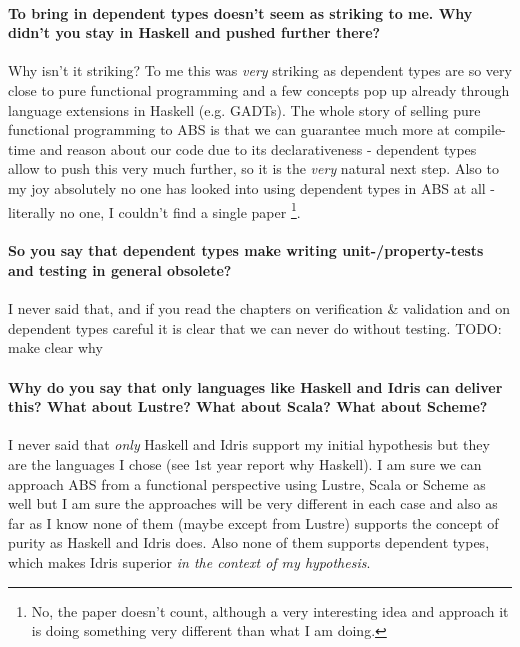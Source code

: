 \paragraph{To bring in dependent types doesn't seem as striking to me. Why didn't you stay in Haskell and pushed further there?}
Why isn't it striking? To me this was \textit{very} striking as dependent types are so very close to pure functional programming and a few concepts pop up already through language extensions in Haskell (e.g. GADTs). The whole story of selling pure functional programming to ABS is that we can guarantee much more at compile-time and reason about our code due to its declarativeness - dependent types allow to push this very much further, so it is the \textit{very} natural next step. Also to my joy absolutely no one has looked into using dependent types in ABS at all - literally no one, I couldn't find a single paper \footnote{No, the paper \cite{botta_functional_2011} doesn't count, although a very interesting idea and approach it is doing something very different than what I am doing.}.

\paragraph{So you say that dependent types make writing unit-/property-tests and testing in general obsolete?}
I never said that, and if you read the chapters on verification \& validation and on dependent types careful it is clear that we can never do without testing. TODO: make clear why

\paragraph{Why do you say that only languages like Haskell and Idris can deliver this? What about Lustre? What about Scala? What about Scheme?}
I never said that \textit{only} Haskell and Idris support my initial hypothesis but they are the languages I chose (see 1st year report why Haskell). I am sure we can approach ABS from a functional perspective using Lustre, Scala or Scheme as well but I am sure the approaches will be very different in each case and also as far as I know none of them (maybe except from Lustre) supports the concept of purity as Haskell and Idris does. Also none of them supports dependent types, which makes Idris superior \textit{in the context of my hypothesis}.

